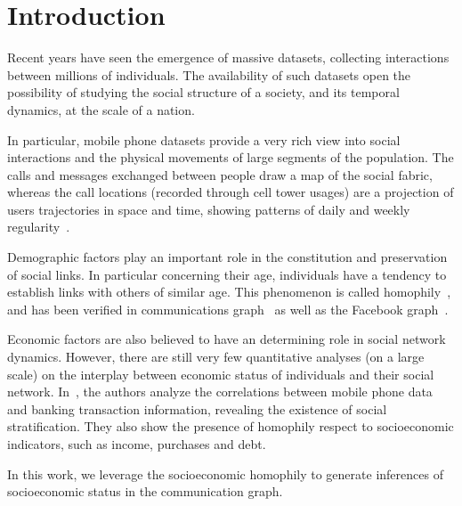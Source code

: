 \section{Introduction}

Recent years have seen the emergence of massive datasets, collecting interactions between millions of individuals. The availability of such datasets open the possibility of studying the social structure of a society, and its temporal dynamics, at the scale of a nation.

In particular, mobile phone datasets provide a very rich view into social interactions and the physical movements of large segments of the population. The calls and messages exchanged between people draw a map of the social fabric, whereas the call locations (recorded through cell tower usages) are a projection of users trajectories in space and time, showing patterns of daily and weekly regularity~\cite{gonzalez2008understanding,ponieman2013human,sarraute2015city}.

Demographic factors play an important role in the constitution and preservation of social links. In particular concerning their age, individuals have a tendency to
establish links with others of similar age. This phenomenon is called homophily~\cite{mcpherson2001birds}, and has been verified in communications graph~\cite{blumenstock2010mobile,sarraute2014} as well as the Facebook graph~\cite{ugander2011anatomy}.

Economic factors are also believed to have an determining role in social network dynamics.
However, there are still very few quantitative analyses (on a large scale) on the interplay between economic status of individuals and their social network.
In~\cite{leo2015socioeconomic}, the authors analyze the correlations between mobile phone data and banking transaction information, revealing the existence of social stratification. They also show the presence of homophily respect to socioeconomic indicators, such as income, purchases and debt.

In this work, we leverage the socioeconomic homophily to generate inferences of socioeconomic status in the communication graph.

